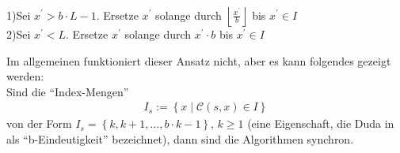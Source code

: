 \documentclass[a4paper,12pt]{article}
\newcommand{\C}{\mathcal C}
\begin{document}
\begin{flushleft}
1)\;Sei  $x^{'} > b\cdot L -1$. Ersetze $x^{'}$ solange durch  $\left\lfloor \frac{x^{'}}{b}  \right\rfloor$  bis $x^{'} \in I$
\\
2)\;Sei  $x^{'} <L$. Ersetze $x^{'}$ solange durch  $x^{'} \cdot b$  bis $x^{'} \in I$
\end{flushleft}
Im allgemeinen funktioniert dieser Ansatz nicht, aber es kann folgendes gezeigt werden:
\\
Sind die "`Index-Mengen"' 
\begin{align*}
I_{s} := \left\{ x\;|\; \C(s,x) \in I  \right\}
\end{align*} 
von der Form $I_s = \left\{k,k+1,\ldots,b\cdot k -1\right\},\, k\geq 1$ (eine Eigenschaft, die Duda in \cite{Duda} als "`b-Eindeutigkeit"' bezeichnet), dann sind die Algorithmen synchron. 
\newpage
\end{document}
